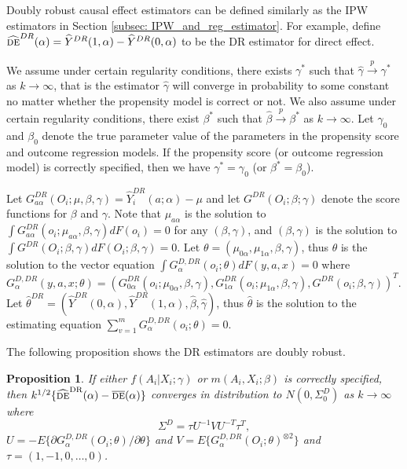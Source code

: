 \documentclass[oupdraft]{bio}
\newtheorem{proposition}{Proposition}
\begin{document}
Doubly robust causal effect estimators can be defined similarly as the IPW estimators in Section \ref{subsec: IPW_and_reg_estimator}. For example, define $\widehat{\textsc{de}}^{DR}(\alpha)=\widehat{Y}^{DR}(1,\alpha)-\widehat{Y}^{DR}(0,\alpha)$ to be the DR estimator for direct effect. 


We assume under certain regularity conditions, there exists $\gamma^{*}$ such that $\hat{\gamma}\xrightarrow{p}\gamma^{*}$ as $k\rightarrow\infty$, that is the estimator $\hat{\gamma}$ will converge in probability to some constant no matter whether the propensity model is correct or not. We also assume under certain regularity conditions, there exist $\beta^{*}$ such that $\hat{\beta}\xrightarrow{p}\beta^{*}$ as $k\rightarrow\infty$. Let $\gamma_0$ and $\beta_0$ denote the true parameter value of the parameters in the propensity score and outcome regression models. If the propensity score (or outcome regression model) is correctly specified, then we have $\gamma^{*}=\gamma_0$ (or $\beta^{*}=\beta_0$).

Let $G^{DR}_{a\alpha}(O_i;\mu,\beta,\gamma) =\widehat{Y}_i^{DR}(a;\alpha)- \mu$ and let $G^{DR}(O_i;\beta;\gamma)$ denote the score functions for $\beta$ and $\gamma$. Note that $\mu_{a\alpha}$ is the solution to $\int G^{DR}_{a\alpha}(o_i;\mu_{a\alpha},\beta,\gamma) dF(o_i) = 0$ for any $(\beta,\gamma)$, and $(\beta,\gamma)$ is the solution to $\int G^{DR}(O_i;\beta,\gamma)dF(O_i;\beta,\gamma)=0$. Let $\theta=(\mu_{0\alpha},\mu_{1\alpha},\beta,\gamma)$, thus $\theta$ is the solution to the vector equation $\int G^{D, DR}_{\alpha}(o_i;\theta) dF(y,a,x) = 0$ where $G^{D,DR}_{\alpha}(y,a,x;\theta)=(G^{DR}_{0\alpha}(o_i;\mu_{0\alpha},\beta,\gamma),G^{DR}_{1\alpha}(o_i;\mu_{1\alpha},\beta,\gamma),G^{DR}(o_i;\beta,\gamma))^T$. Let $\hat\theta^{DR}=(\hat Y^{DR}(0,\alpha),\hat Y^{DR}(1,\alpha),\hat\beta,\hat\gamma)$, thus $\hat \theta$ is the solution to the estimating equation $\sum_{v=1}^m G^{D,DR}_{\alpha}(o_i;\theta)=0$. 

The following proposition shows the DR estimators are doubly robust.


\begin{proposition}\label{thm: DR_CAN}
If either $f(A_i|X_i;\gamma)$ or $m(A_i,X_i;\beta)$ is correctly specified, then \emph{$k^{1/2}\{\widehat{\textsc{de}}^{\text{DR}}(\alpha)-\overline{\textsc{de}}(\alpha)\}$} converges in distribution to $N(0,\Sigma_0^{D})$ as $k \to \infty$ where 
\[
\Sigma^{D} = \tau U^{-1} V U^{-T}\tau^T,
\]
$U=-E\{\partial G_{\alpha}^{D,DR}(O_i;\theta)/\partial \theta\}$ and $V=E\{G_{\alpha}^{D,DR}(O_i;\theta)^{\otimes 2}\}$ and $\tau=(1,-1, 0,\ldots,0)$.
\end{proposition}
\end{document}
